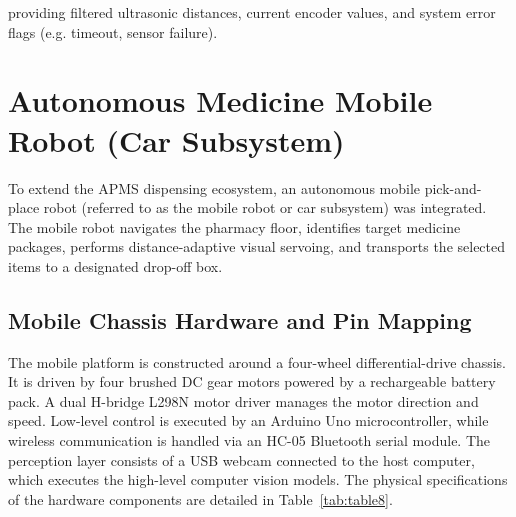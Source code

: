 \documentclass[12pt,a4paper,oneside]{report}
\begin{document}
providing filtered ultrasonic distances, current encoder values, and
system error flags (e.g. timeout, sensor failure).

\section{Autonomous Medicine Mobile Robot (Car
Subsystem)}\label{autonomous-medicine-mobile-robot-car-subsystem}

To extend the APMS dispensing ecosystem, an autonomous mobile
pick-and-place robot (referred to as the mobile robot or car subsystem)
was integrated. The mobile robot navigates the pharmacy floor,
identifies target medicine packages, performs distance-adaptive visual
servoing, and transports the selected items to a designated drop-off
box.

\subsection{Mobile Chassis Hardware and Pin
Mapping}\label{mobile-chassis-hardware-and-pin-mapping}

The mobile platform is constructed around a four-wheel
differential-drive chassis. It is driven by four brushed DC gear motors
powered by a rechargeable battery pack. A dual H-bridge L298N motor
driver manages the motor direction and speed. Low-level control is
executed by an Arduino Uno microcontroller, while wireless communication
is handled via an HC-05 Bluetooth serial module. The perception layer
consists of a USB webcam connected to the host computer, which executes
the high-level computer vision models. The physical specifications of
the hardware components are detailed in Table~\ref{tab:table8}.
\end{document}
